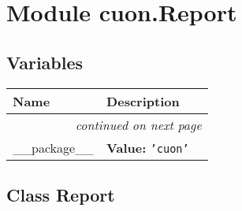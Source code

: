 %
%
%


\section{Module cuon.Report}

    \label{cuon:Report}


  \subsection{Variables}

    \vspace{-1cm}
\hspace{\varindent}\begin{longtable}{|p{\varnamewidth}|p{\vardescrwidth}|l}
\cline{1-2}
\cline{1-2} \centering \textbf{Name} & \centering \textbf{Description}& \\
\cline{1-2}
\endhead\cline{1-2}\multicolumn{3}{r}{\small\textit{continued on next page}}\\\endfoot\cline{1-2}
\endlastfoot\raggedright \_\-\_\-p\-a\-c\-k\-a\-g\-e\-\_\-\_\- & \raggedright \textbf{Value:} 
{\tt \texttt{'}\texttt{cuon}\texttt{'}}&\\
\cline{1-2}
\end{longtable}



\subsection{Class Report}

